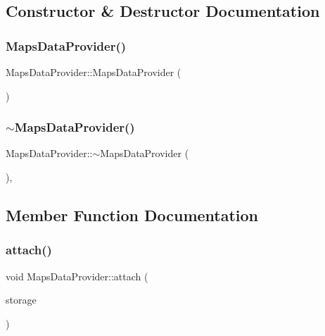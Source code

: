 \subsection{Constructor \& Destructor Documentation}
\mbox{\label{class_maps_data_provider_ab1c35fe348c21b53e07d17157d35ca87}} 
\subsubsection{\texorpdfstring{MapsDataProvider()}{MapsDataProvider()}}
{\footnotesize\ttfamily Maps\+Data\+Provider\+::\+Maps\+Data\+Provider (\begin{DoxyParamCaption}{ }\end{DoxyParamCaption})}

\mbox{\label{class_maps_data_provider_a3dfcf4f1d0e7cef6a5ddd37a97d26e73}} 
\subsubsection{\texorpdfstring{$\sim$MapsDataProvider()}{~MapsDataProvider()}}
{\footnotesize\ttfamily Maps\+Data\+Provider\+::$\sim$\+Maps\+Data\+Provider (\begin{DoxyParamCaption}{ }\end{DoxyParamCaption})\hspace{0.3cm}{\ttfamily [default]}, {\ttfamily [noexcept]}}



\subsection{Member Function Documentation}
\mbox{\label{class_maps_data_provider_a9853ba4d6845a6f4de6ad4ef381e6e3c}} 
\subsubsection{\texorpdfstring{attach()}{attach()}}
{\footnotesize\ttfamily void Maps\+Data\+Provider\+::attach (\begin{DoxyParamCaption}\item[{std\+::shared\+\_\+ptr$<$ \mbox{\hyperlink{class_s_q_lite_output_storage}{S\+Q\+Lite\+Output\+Storage}} $>$}]{storage }\end{DoxyParamCaption})}

